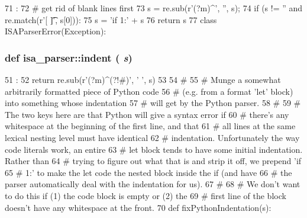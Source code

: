 \begin{DoxyCode}
71                            :
72     # get rid of blank lines first
73     s = re.sub(r'(?m)^\s*\n', '', s);
74     if (s != '' and re.match(r'[ \t]', s[0])):
75         s = 'if 1:\n' + s
76     return s
77 
class ISAParserError(Exception):
\end{DoxyCode}
\hypertarget{namespaceisa__parser_a1c088ad12029969bc19bfc9d6310a1ff}{
\subsubsection[{indent}]{\setlength{\rightskip}{0pt plus 5cm}def isa\_\-parser::indent ( {\em s})}}
\label{namespaceisa__parser_a1c088ad12029969bc19bfc9d6310a1ff}



\begin{DoxyCode}
51              :
52     return re.sub(r'(?m)^(?!#)', '  ', s)
53 
54 #
55 # Munge a somewhat arbitrarily formatted piece of Python code
56 # (e.g. from a format 'let' block) into something whose indentation
57 # will get by the Python parser.
58 #
59 # The two keys here are that Python will give a syntax error if
60 # there's any whitespace at the beginning of the first line, and that
61 # all lines at the same lexical nesting level must have identical
62 # indentation.  Unfortunately the way code literals work, an entire
63 # let block tends to have some initial indentation.  Rather than
64 # trying to figure out what that is and strip it off, we prepend 'if
65 # 1:' to make the let code the nested block inside the if (and have
66 # the parser automatically deal with the indentation for us).
67 #
68 # We don't want to do this if (1) the code block is empty or (2) the
69 # first line of the block doesn't have any whitespace at the front.
70 
def fixPythonIndentation(s):
\end{DoxyCode}


